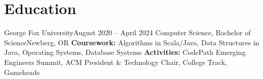 \section{Education}
  \resumeSubHeadingListStart
    \resumeEducationSubheading
        {George Fox University}{August 2020 -- April 2024}
        {Computer Science, Bachelor of Science}{Newberg, OR}
        {\textbf{Coursework:} Algorithms in Scala/Java, Data Structures in Java, Operating Systems, Database Systems}
        {\textbf{Activities:} CodePath Emerging Engineers Summit, ACM President \& Technology Chair, College Track, Gameheads}
  \resumeSubHeadingListEnd


